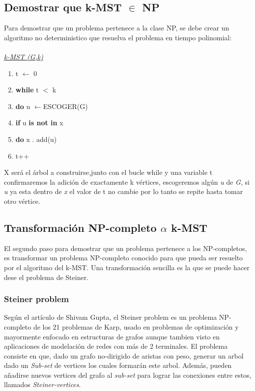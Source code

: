 \documentclass[spanish,12pt]{elsarticle}
\newcommand{\blank}[1]{\hspace*{#1}}
\begin{document}
\subsection{Demostrar que k-MST $\in$ NP}
Para demostrar que un problema pertenece a la clase NP, se debe crear un algoritmo no deterministico que resuelva el problema en tiempo polinomial:\\\\
\textit{\underline{k-MST (G,k)} }
\begin{enumerate}
    \item  \textnormal{t $\leftarrow$ 0}
    \item  \textnormal{\textbf{while} t $<$ k}
    \item \textnormal{\blank{1cm}\textbf{do} u $\leftarrow${ESCOGER(G)}}
    \item  \textnormal{\blank{2cm}\textbf{if} u \textbf{is not in} x}
    \item \textnormal{\blank{3cm}\textbf{do} x . add(u)}
     \item \textnormal{\blank{3cm} t++}\\
\end{enumerate}
X será el árbol a construirse,junto con el bucle while y una variable t confirmaremos la adición de  exactamente k vértices, escogeremos algún \textit{u} de \textit{G}, si \textit{u} ya esta dentro de \textit{x} el valor de t no cambie por lo tanto se repite hasta tomar otro vértice.

\subsection{Transformación NP-completo $\alpha$  k-MST}
El segundo paso para demostrar que un problema pertenece a los NP-completos, es transformar un problema NP-completo conocido para que pueda ser resuelto por el algoritmo del k-MST. Una transformación sencilla es la que se puede hacer dese el problema de Steiner.
\subsubsection{Steiner problem}
Según el artículo de Shivam Gupta\cite{2}, el Steiner problem es un problema NP-completo de los 21 problemas de Karp, usado en problemas de optimización y mayormente enfocado en estructuras de grafos aunque tambien visto en aplicaciones de modelación de redes con más de 2 terminales. El problema consiste en que, dado un grafo no-dirigido de aristas con peso, generar un arbol dado un
\textit{Sub-set} de vertices los cuales formarán este arbol. Además, pueden añadirse nuevos vertices del grafo al \textit{sub-set} para lograr las conexiones entre estos, llamados \textit{Steiner-vertices}.\\
\end{document}
